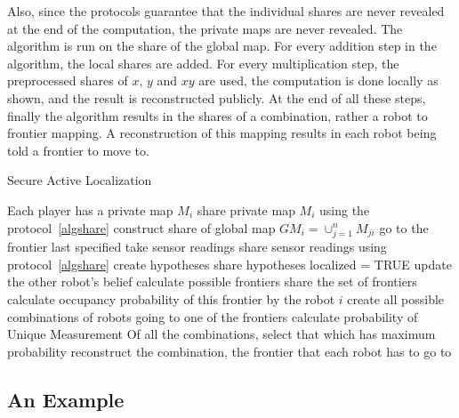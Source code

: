 Also, since the protocols guarantee that the individual shares are never revealed at the end of the computation, the 
private maps are never revealed. The algorithm is run on the share of the global map. For every addition step in the 
algorithm, the local shares are added. For every multiplication step, the preprocessed shares of $x$, $y$ and $xy$ are used, 
the computation is done locally as shown, and the result is 
reconstructed publicly. At the end of all these steps, finally the algorithm results in the shares of a combination, 
rather a robot to frontier mapping. A reconstruction of this mapping results in each robot being told a frontier to move to. 



\begin{algorithm}
\caption{Secure Active Localization}
\label{algsecloc}
\begin{algorithmic}
\STATE {}
\STATE {}
\REQUIRE Each player has a private map $M_{i}$
\STATE share private map $M_{i}$ using the protocol~\ref{algshare} 
\STATE {}
\STATE construct share of global map $GM_{i} = \cup_{j=1}^{n}M_{ji}$
\STATE {}
\ENDFOR
\REPEAT
\STATE go to the frontier last specified
\STATE take sensor readings
\STATE share sensor readings using protocol~\ref{algshare}
\STATE create hypotheses
\STATE share hypotheses	
\STATE localized = TRUE
\ENDIF
{}
		\STATE update the other robot's belief
	\ENDIF
\ENDIF
\STATE calculate possible frontiers
\STATE share the set of frontiers
		\STATE calculate occupancy probability of this frontier by the robot $i$
	\ENDFOR
\ENDFOR
\STATE create all possible combinations of robots going to one of the frontiers
	\STATE calculate probability of Unique Measurement
\ENDFOR
\STATE Of all the combinations, select that which has maximum probability
\STATE reconstruct the combination, the frontier that each robot has to go to 
\end{algorithmic}
\end{algorithm}


\subsection{An Example}
\label{sec:ex}	

